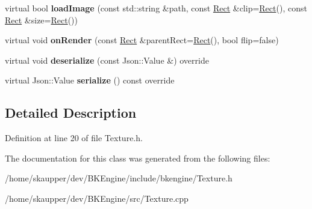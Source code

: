 \begin{DoxyCompactItemize}
virtual bool {\bfseries load\+Image} (const std\+::string \&path, const \hyperlink{structbkengine_1_1Rect}{Rect} \&clip=\hyperlink{structbkengine_1_1Rect}{Rect}(), const \hyperlink{structbkengine_1_1Rect}{Rect} \&size=\hyperlink{structbkengine_1_1Rect}{Rect}())
\item 
\mbox{\label{classbkengine_1_1Texture_a6a747f0cbe6320bd0e1a7f33281f0f7d}} 
virtual void {\bfseries on\+Render} (const \hyperlink{structbkengine_1_1Rect}{Rect} \&parent\+Rect=\hyperlink{structbkengine_1_1Rect}{Rect}(), bool flip=false)
\item 
\mbox{\label{classbkengine_1_1Texture_afaf8154bb525d6b600c1850822714d5c}} 
virtual void {\bfseries deserialize} (const Json\+::\+Value \&) override
\item 
\mbox{\label{classbkengine_1_1Texture_af1e8d8e6738ead367fadd06522be2c56}} 
virtual Json\+::\+Value {\bfseries serialize} () const override
\end{DoxyCompactItemize}


\subsection{Detailed Description}


Definition at line 20 of file Texture.\+h.



The documentation for this class was generated from the following files\+:\begin{DoxyCompactItemize}
\item 
/home/skaupper/dev/\+B\+K\+Engine/include/bkengine/Texture.\+h\item 
/home/skaupper/dev/\+B\+K\+Engine/src/Texture.\+cpp\end{DoxyCompactItemize}

